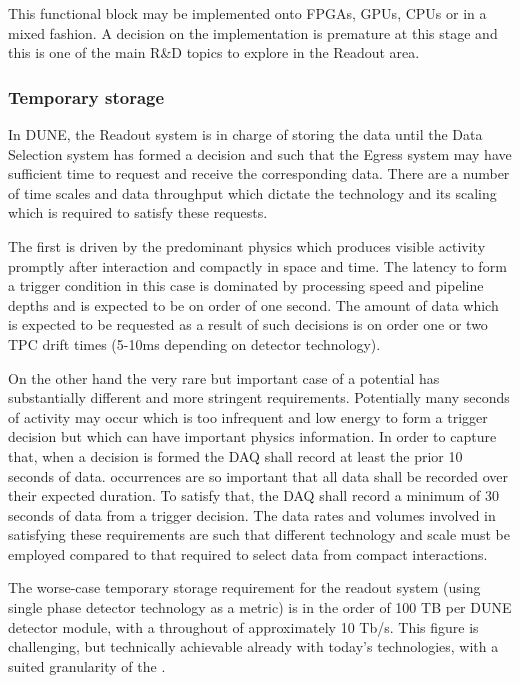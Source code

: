 This functional block may be implemented onto FPGAs, GPUs, CPUs or in a mixed fashion. A decision on the implementation is premature at this stage and this is one of the main R\&D topics to explore in the Readout area.

\subsubsection{Temporary storage}

In DUNE, the Readout system is in charge of storing the data until the Data Selection system has formed a decision and such that the Egress system may have sufficient time to request and receive the corresponding data.
There are a number of time scales and data throughput which dictate the technology and its scaling which is required to satisfy these requests.

The first is driven by the predominant physics which produces visible activity promptly after interaction and compactly in space and time. 
The latency to form a trigger condition in this case is dominated by processing speed and pipeline depths and is expected to be on order of one second.  The amount of data which is expected to be requested as a result of such decisions is on order one or two TPC drift times (5-10\si{\milli\second} depending on detector technology).

On the other hand the very rare but important case of a potential  has substantially different and more stringent requirements. 
Potentially many seconds of activity may occur which is too infrequent and low energy to form a trigger decision but which can have important physics information. 
In order to capture that, when a  decision is formed the DAQ shall record at least the prior 10 seconds of data. 
 occurrences are so important that all data shall be recorded over their expected duration. 
To satisfy that, the DAQ shall record a minimum of 30 seconds of data from a  trigger decision. 
The data rates and volumes involved in satisfying these requirements are such that different technology and scale must be employed compared to that required to select data from compact interactions.

The worse-case temporary storage requirement for the readout system (using single phase detector technology as a metric) is in the order of 100 TB per DUNE detector module, with a throughout of approximately 10 Tb/s.
This figure is challenging, but technically achievable already with today's technologies, with a suited granularity of the . 

